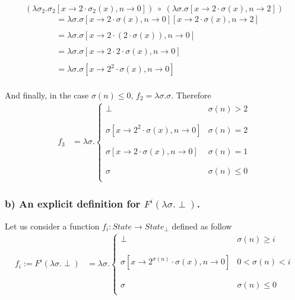 \documentclass{article}
\begin{document}
$$(\lambda \sigma_2 . \sigma_2 [x \rightarrow 2 \cdot \sigma_2(x), n \rightarrow 0]) \; \circ \; (\lambda \sigma . \sigma [x \rightarrow 2 \cdot \sigma(x), n \rightarrow 2])$$
\begin{align*}
&= \lambda \sigma . \sigma[x\rightarrow 2 \cdot \sigma(x), n \rightarrow 0][x\rightarrow 2 \cdot \sigma(x), n \rightarrow 2] \\ \\
&= \lambda \sigma . \sigma[x\rightarrow 2 \cdot (2 \cdot \sigma(x)), n \rightarrow 0] \\ \\
& = \lambda \sigma . \sigma[x\rightarrow 2 \cdot 2 \cdot \sigma(x), n \rightarrow 0] \\ \\
& = \lambda \sigma . \sigma[x\rightarrow 2^2 \cdot \sigma(x), n \rightarrow 0]
\end{align*}\\
And finally, in the case $\sigma(n) \leq 0$, $f_2 = \lambda \sigma . \sigma$. Therefore\\
\begin{align}
f_3 &= \lambda \sigma . \left\{
\begin{array}{ll}
      \perp & \sigma(n) > 2 \\
      \\ \\
      \sigma[x\rightarrow 2^2 \cdot \sigma(x), n \rightarrow 0] & \sigma(n) = 2 \\
    \\ \\
      \sigma[x\rightarrow 2 \cdot \sigma(x), n \rightarrow 0] & \sigma(n) = 1 \\
      \\ \\
      \sigma & \sigma(n) \leq 0 \\
\end{array} 
\right.
\end{align}

\subsubsection*{b) An explicit definition for $F^i(\lambda\sigma.\perp)$.}
Let us consider a function $f_i: State \longrightarrow State_{\perp}$ defined as follow
\begin{align*}
f_i := F^i(\lambda\sigma.\perp) &= \lambda \sigma . \left\{
\begin{array}{ll}
      \perp & \sigma(n) \geq i \\
      \\ \\
      \sigma[x\rightarrow 2^{\sigma(n)} \cdot \sigma(x), n \rightarrow 0] & 0 < \sigma(n) < i \\
      \\ \\
      \sigma & \sigma(n) \leq 0 \\
\end{array} 
\right.
\end{align*}
\end{document}
